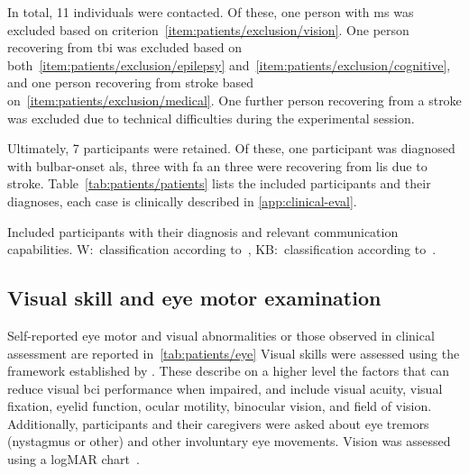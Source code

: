\documentclass{article}
\newcommand{\skill}{{\color{gdvGreen}{$\pmb{+}$}}}
\newcommand{\noskill}{{\color{gdvOrange}{$\pmb{-}$}}}
\newcommand{\snoskill}{{\color{gdvRed}{$\pmb{/}$}}}
\begin{document}
In total, 11 individuals were contacted. Of these, one person with
\ac{ms} was excluded based on criterion~\ref{item:patients/exclusion/vision}.
One person recovering from \ac{tbi} was excluded based on both~\ref{item:patients/exclusion/epilepsy}
and~\ref{item:patients/exclusion/cognitive}, and one person recovering from
stroke based on~\ref{item:patients/exclusion/medical}.
One further person recovering from a stroke was excluded due to technical
difficulties during the experimental session.

Ultimately, 7 participants were retained.
Of these, one participant was diagnosed with bulbar-onset \ac{als}, three with
\ac{fa} an three were recovering from \ac{lis} due to stroke.
Table~\ref{tab:patients/patients} lists the included participants and their
diagnoses, each case is clinically described in \cref{app:clinical-eval}.
\begin{table}
	\footnotesize
	
	\caption{Included participants with their diagnosis and relevant communication
		capabilities.
		W:\ classification according
		to~\textcite{Wolpaw2006}, KB:\ classification according
		to~\textcite{Kuebler2008}.
	}%
	\label{tab:patients/patients}
\end{table}


\subsection{Visual skill and eye motor examination}

Self-reported eye motor and visual abnormalities or those observed in clinical
assessment are reported in~\cref{tab:patients/eye}
Visual skills were assessed using the framework established by \textcite{FriedOken2020}.
These describe on a higher level the factors that can reduce visual \ac{bci} performance when impaired,
and include visual acuity, visual fixation, eyelid function, ocular motility,
binocular vision, and field of vision.
Additionally, participants and their caregivers were asked about eye tremors
(nystagmus or other) and other involuntary eye movements.
Vision was assessed using a logMAR chart~\cite{Bailey1976}.
\begin{table}
	
	\caption[Visual skills of the included participants.]{%
		Self-reported visual skills as defined by \textcite{FriedOken2020} of
		gaze-impaired participants included in this study.
		\skill\ skilled, \noskill\ impaired, \snoskill\ severely impaired.
		Visual acuity was assessed using the logMAR scale (lower is better).
	}%
	\label{tab:patients/eye}
\end{table}
\end{document}
